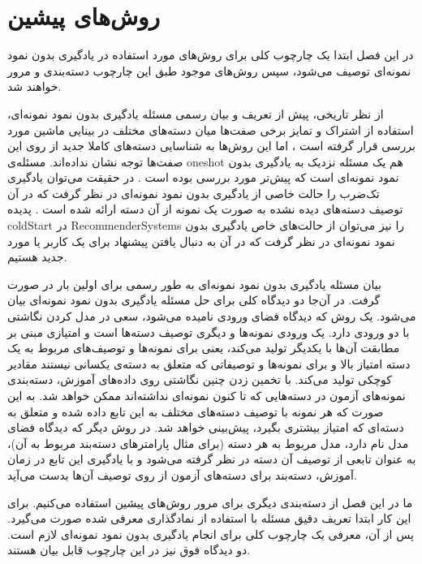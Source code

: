 \chapter{روش‌های پیشین} \label{chap:lr}
در این فصل ابتدا یک چارچوب کلی برای روش‌های مورد استفاده در یادگیری بدون نمود نمونه‌ای توصیف می‌شود، سپس روش‌های موجود طبق این چارچوب دسته‌بندی و مرور خواهند شد.


از نظر تاریخی، پیش از تعریف و بیان رسمی مسئله یادگیری بدون نمود نمونه‌ای، استفاده از اشتراک و تمایز برخی صفت‌ها میان دسته‌های مختلف در بینایی ماشین مورد بررسی قرار گرفته است
\cite{BakkerH03, TsochantaridisJHA05, ulman2005}،
اما این روش‌ها به شناسایی دسته‌های کاملا جدید از روی این صفت‌ها توجه نشان نداده‌اند.
مسئله‌ی \gls{oneshot}
هم یک مسئله نزدیک به یادگیری بدون نمود نمونه‌ای است که پیش‌تر مورد بررسی بوده است
\cite{miller12}.
در حقیقت می‌توان یادگیری تک‌ضرب را حالت خاصی از یادگیری بدون نمود نمونه‌ای در نظر گرفت که در آن توصیف دسته‌های دیده نشده به صورت یک نمونه از آن دسته ارائه شده است
\cite{bengio08}.
 پدیده \gls{coldStart}
 در \glspl{RecommenderSystem}
 را نیز می‌توان از حالت‌های خاص یادگیری بدون نمود نمونه‌ای در نظر گرفت که در آن به دنبال یافتن پیشنهاد برای یک کاربر یا مورد جدید هستیم.


بیان مسئله  یادگیری بدون نمود نمونه‌ای به طور رسمی برای اولین بار در
\cite{bengio08}
صورت گرفت. در آن‌جا دو دیدگاه کلی برای حل مسئله یادگیری بدون نمود نمونه‌ای بیان می‌شود. یک روش که دیدگاه فضای ورودی
نامیده می‌شود، سعی در مدل کردن نگاشتی با دو ورودی دارد. یک ورودی نمونه‌ها و دیگری توصیف دسته‌ها است و امتیازی مبنی بر مطابقت آن‌ها با یکدیگر تولید می‌کند، یعنی برای نمونه‌ها و توصیف‌های مربوط به یک دسته امتیاز بالا و برای نمونه‌ها و توصیفاتی که متعلق به دسته‌ی یکسانی نیستند مقادیر کوچکی تولید می‌کند. با تخمین زدن چنین نگاشتی روی داده‌های آموزش، دسته‌بندی نمونه‌های آزمون در دسته‌هایی که تا کنون نمونه‌ای نداشته‌اند ممکن خواهد شد. به این صورت که هر نمونه با توصیف دسته‌های مختلف به این تابع داده شده و متعلق به دسته‌ای که امتیاز بیشتری بگیرد، پیش‌بینی خواهد شد.
در روش دیگر که دیدگاه فضای مدل
نام دارد، مدل مربوط به هر دسته (برای مثال پارامترهای دسته‌بند مربوط به آن)، به عنوان تابعی از توصیف آن دسته در نظر گرفته می‌شود و با یادگیری این تابع در زمان آموزش، دسته‌بند برای دسته‌های آزمون از روی توصیف آن‌ها بدست می‌آید.

ما در این فصل از دسته‌بندی دیگری برای مرور روش‌های پیشین استفاده می‌کنیم. برای این کار ابتدا تعریف دقیق مسئله با استفاده از نمادگذاری معرفی شده صورت می‌گیرد. پس از آن، معرفی یک چارچوب کلی برای انجام یادگیری بدون نمود نمونه‌ای لازم است. دو دیدگاه فوق نیز در این چارچوب قابل بیان هستند.

